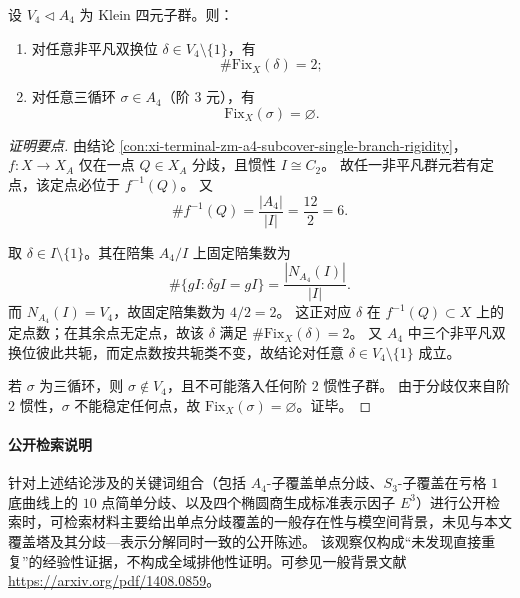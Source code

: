 \begin{conclusion}\label{con:xi-terminal-zm-a4-fixedpoint-spectrum-v4-c3}
设 \(V_4\lhd A_4\) 为 Klein 四元子群。则：
\begin{enumerate}
  \item 对任意非平凡双换位 \(\delta\in V_4\setminus\{1\}\)，有
  \[
  \#\mathrm{Fix}_X(\delta)=2;
  \]
  \item 对任意三循环 \(\sigma\in A_4\)（阶 \(3\) 元），有
  \[
  \mathrm{Fix}_X(\sigma)=\varnothing.
  \]
\end{enumerate}
\end{conclusion}
\begin{proof}[证明要点]
由结论 \ref{con:xi-terminal-zm-a4-subcover-single-branch-rigidity}，\(f:X\to X_A\) 仅在一点 \(Q\in X_A\) 分歧，且惯性 \(I\cong C_2\)。
故任一非平凡群元若有定点，该定点必位于 \(f^{-1}(Q)\)。
又
\[
\#f^{-1}(Q)=\frac{|A_4|}{|I|}=\frac{12}{2}=6.
\]

取 \(\delta\in I\setminus\{1\}\)。其在陪集 \(A_4/I\) 上固定陪集数为
\[
\#\{gI:\delta gI=gI\}
=\frac{|N_{A_4}(I)|}{|I|}.
\]
而 \(N_{A_4}(I)=V_4\)，故固定陪集数为 \(4/2=2\)。
这正对应 \(\delta\) 在 \(f^{-1}(Q)\subset X\) 上的定点数；在其余点无定点，故该 \(\delta\) 满足 \(\#\mathrm{Fix}_X(\delta)=2\)。
又 \(A_4\) 中三个非平凡双换位彼此共轭，而定点数按共轭类不变，故结论对任意 \(\delta\in V_4\setminus\{1\}\) 成立。

若 \(\sigma\) 为三循环，则 \(\sigma\notin V_4\)，且不可能落入任何阶 \(2\) 惯性子群。
由于分歧仅来自阶 \(2\) 惯性，\(\sigma\) 不能稳定任何点，故 \(\mathrm{Fix}_X(\sigma)=\varnothing\)。证毕。
\end{proof}

\paragraph{公开检索说明}
针对上述结论涉及的关键词组合（包括 \(A_4\)-子覆盖单点分歧、\(S_3\)-子覆盖在亏格 \(1\) 底曲线上的 \(10\) 点简单分歧、以及四个椭圆商生成标准表示因子 \(E^3\)）进行公开检索时，可检索材料主要给出单点分歧覆盖的一般存在性与模空间背景，未见与本文覆盖塔及其分歧—表示分解同时一致的公开陈述。
该观察仅构成“未发现直接重复”的经验性证据，不构成全域排他性证明。可参见一般背景文献 \url{https://arxiv.org/pdf/1408.0859}。

\endinput
